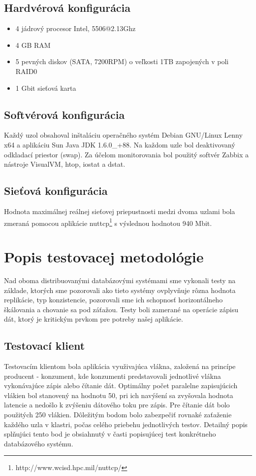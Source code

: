 \documentclass[11pt,twoside,a4paper]{book}
\begin{document}
\subsection*{Hardvérová konfigurácia}
\begin{itemize}
 \item 4 jádrový procesor Intel, 5506@2.13Ghz
 \item 4 GB RAM
 \item 5 pevných diskov (SATA, 7200RPM) o veľkosti 1TB zapojených v poli RAID0
 \item 1 Gbit sieťová karta
\end{itemize}

\subsection*{Softvérová konfigurácia} 
Každý uzol obsahoval inštaláciu operačného systém Debian GNU/Linux Lenny x64 a aplikáciu Sun Java JDK 1.6.0\_+88. Na každom uzle bol deaktivovaný odkladací priestor (swap). Za účelom monitorovania bol použitý softvér Zabbix a nástroje VisualVM, htop, iostat a dstat.

\subsection*{Sieťová konfigurácia}

Hodnota maximálnej reálnej sieťovej priepustnosti medzi dvoma uzlami bola zmeraná pomocou aplikácie nuttcp\footnote{http://www.wcisd.hpc.mil/nuttcp/} s výslednou hodnotou 940 Mbit.

\section{Popis testovacej metodológie}

Nad oboma distribuovanými databázovými systémami sme vykonali testy na základe, ktorých sme pozorovali ako tieto systémy ovplyvňuje rôzna hodnota replikácie, typ konzistencie, pozorovali sme ich schopnosť horizontálneho škálovania a chovanie sa pod záťažou. Testy boli zamerané na operácie zápisu dát, ktorý je kritickým prvkom pre potreby našej aplikácie.

\subsection{Testovací klient}

Testovacím klientom bola aplikácia využivajúca vlákna, založená na princípe producent - konzument, kde konzumenti predstavovali jednotlivé vlákna vykonávajúce zápis alebo čítanie dát. Optimálny počet paralelne zapisujúcich vlákien bol stanovený na hodnotu 50, pri ich navýšení sa zvyšovala hodnota latencie a nedošlo k zvýšeniu dátového toku pre zápis. Pre čítanie dát bolo použitých 250 vlákien. Dôležitým bodom bolo zabezpečiť rovnaké zaťaženie každého uzla v klastri, počas celého priebehu jednotlivých testov. Detailný popis splňujúci tento bod je obsiahnutý v časti popisujúcej test konkrétneho databázového systému.
\end{document}

